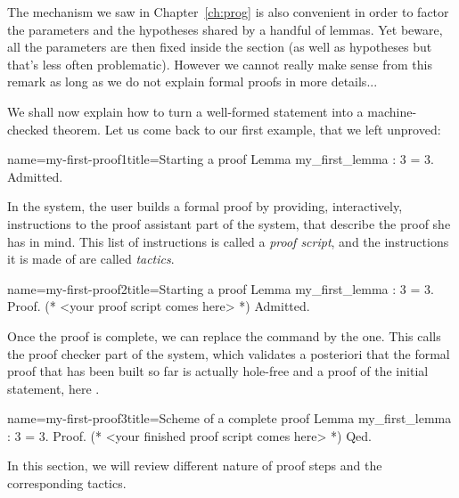 
The  mechanism we saw in Chapter~\ref{ch:prog} is also
convenient in order to factor the parameters and the hypotheses shared
by a handful of lemmas. Yet beware, all the parameters are then fixed
inside the section (as well as hypotheses but that's less often
problematic). However we cannot really make sense from this remark as
long as we do not explain formal proofs in more details...


We shall now explain how to turn a well-formed statement into a
machine-checked theorem. Let us come back to our first example, that
we left unproved:
\begin{coq}{name=my-first-proof1}{title=Starting a proof}
Lemma my_first_lemma : 3 = 3.
Admitted.
\end{coq}
In the \Coq{} system, the user builds a formal proof by providing,
interactively, instructions to the proof assistant part of the \Coq{}
system, that describe the proof she has in mind. This list of
instructions is called a \emph{proof script}, and the instructions it
is made of are called \emph{tactics}.

\begin{coq}{name=my-first-proof2}{title=Starting a proof}
Lemma my_first_lemma : 3 = 3.
Proof.
(* <your proof script comes here> *)
Admitted.
\end{coq}

Once the proof is complete, we can replace the  command by
the  one. This calls the proof checker part of  the \Coq{}
system, which validates a posteriori that the formal proof that has
been built so far is actually hole-free and a proof of the initial
statement, here .

\begin{coq}{name=my-first-proof3}{title=Scheme of a complete proof}
Lemma my_first_lemma : 3 = 3.
Proof.
(* <your finished proof script comes here> *)
Qed.
\end{coq}

In this section, we will review different nature of proof steps and
the corresponding tactics.

